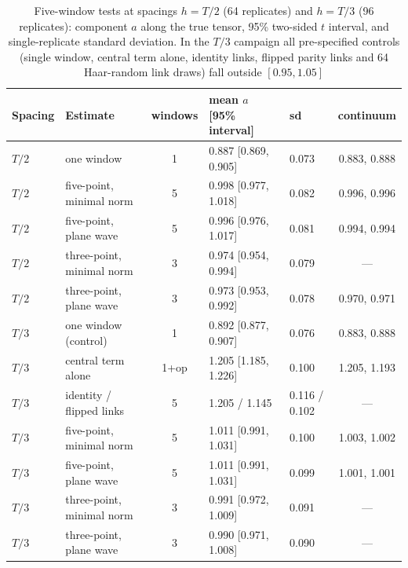 \documentclass[11pt,a4paper]{article}
\begin{document}
\begin{table}[t]
\centering\small
\caption{Five-window tests at spacings $h=T/2$ (64 replicates) and
$h=T/3$ (96 replicates): component $a$ along the true tensor, 95\%
two-sided $t$ interval, and single-replicate standard deviation. In the
$T/3$ campaign all pre-specified controls (single window, central term
alone, identity links, flipped parity links and 64 Haar-random link draws)
fall outside $[0.95,1.05]$}
\label{windowtable}
\begin{tabular}{@{}llcllc@{}}
\toprule
Spacing & Estimate & windows & mean $a$ [95\% interval] & sd & continuum\\
\midrule
$T/2$ & one window & 1 & 0.887 [0.869, 0.905] & 0.073 & 0.883, 0.888\\
$T/2$ & five-point, minimal norm & 5 & 0.998 [0.977, 1.018] & 0.082 & 0.996, 0.996\\
$T/2$ & five-point, plane wave & 5 & 0.996 [0.976, 1.017] & 0.081 & 0.994, 0.994\\
$T/2$ & three-point, minimal norm & 3 & 0.974 [0.954, 0.994] & 0.079 & ---\\
$T/2$ & three-point, plane wave & 3 & 0.973 [0.953, 0.992] & 0.078 & 0.970, 0.971\\
\midrule
$T/3$ & one window (control) & 1 & 0.892 [0.877, 0.907] & 0.076 & 0.883, 0.888\\
$T/3$ & central term alone & 1+op & 1.205 [1.185, 1.226] & 0.100 & 1.205, 1.193\\
$T/3$ & identity / flipped links & 5 & 1.205 / 1.145 & 0.116 / 0.102 & ---\\
$T/3$ & five-point, minimal norm & 5 & 1.011 [0.991, 1.031] & 0.100 & 1.003, 1.002\\
$T/3$ & five-point, plane wave & 5 & 1.011 [0.991, 1.031] & 0.099 & 1.001, 1.001\\
$T/3$ & three-point, minimal norm & 3 & 0.991 [0.972, 1.009] & 0.091 & ---\\
$T/3$ & three-point, plane wave & 3 & 0.990 [0.971, 1.008] & 0.090 & ---\\
\bottomrule
\end{tabular}
\end{table}
\end{document}
